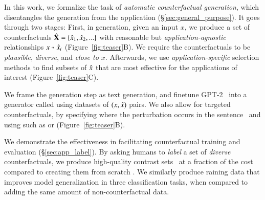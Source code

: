 In this work, we formalize the task of \emph{automatic counterfactual generation}, which disentangles the generation from the application (\S\ref{sec:general_purpose}).
It goes through two stages:
First, in generation, given an input $x$, we produce a set of counterfactuals $\hat{\mathbf{X}} = \{\hat{x}_1, \hat{x}_2, ...\}$ with reasonable but \emph{application-agnostic} relationships $x \veryshortarrow \xp_i$ (Figure~\ref{fig:teaser}B).
We require the counterfactuals to be \emph{plausible}, \emph{diverse}, and \emph{close to $x$}.
Afterwards, we use \emph{application-specific} selection methods to find subsets of $\hat{x}$ that are most effective for the applications of interest (Figure~\ref{fig:teaser}C).

We frame the generation step as text generation, and finetune GPT-2~\cite{radford2019language} into a generator called \sysname using datasets of $(x, \hat{x})$ pairs. 
We also allow for targeted counterfactuals, by specifying where the perturbation occurs in the sentence~\cite{donahue2020enabling} and using \tagstrs such as  or  (Figure~\ref{fig:teaser}B). 

We demonstrate the effectiveness in facilitating counterfactual training and evaluation (\S\ref{sec:app_label}). 
By asking humans to \emph{label} a set of \emph{diverse} counterfactuals, we produce high-quality contrast sets~\cite{gardner2020contrast} at a fraction of the cost compared to creating them from scratch \cite{gardner2020contrast, kaushik2019learning}.
We similarly produce raining data that improves model generalization in three classification tasks, when compared to adding the same amount of non-counterfactual data.



